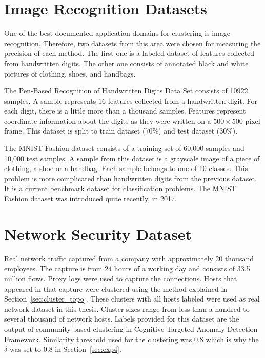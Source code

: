 \documentclass[thesis=B,english]{FITthesis}[2012/10/20]
\begin{document}
\section{Image Recognition Datasets}
One of the best-documented application domains for clustering is image recognition.
Therefore, two datasets from this area were chosen for measuring the precision of each method.
The first one is a labeled dataset of features collected from handwritten digits.
The other one consists of annotated black and white pictures of clothing, shoes, and handbags.

The Pen-Based Recognition of Handwritten Digits Data Set \cite{dua1998pendigit} consists of 10922 samples.
A sample represents 16 features collected from a handwritten digit.
For each digit, there is a little more than a thousand samples.
Features represent coordinate information about the digits as they were written on a $500\times500$ pixel frame.
This dataset is split to train dataset (70\%) and test dataset (30\%).

The MNIST Fashion dataset \cite{xiao2017fashion} consists of a training set of 60,000 samples and 10,000 test samples.
A sample from this dataset is a grayscale image of a piece of clothing, a shoe or a handbag.
Each sample belongs to one of 10 classes.
This problem is more complicated than handwritten digits from the previous dataset.
It is a current benchmark dataset for classification problems.
The MNIST Fashion dataset was introduced quite recently, in 2017.

\section{Network Security Dataset}\label{sec:real-data}
Real network traffic captured from a company with approximately 20 thousand employees.
The capture is from 24 hours of a working day and consists of 33.5  million flows.
Proxy logs were used to capture the connections.
Hosts that appeared in that capture were clustered using the method explained in Section~\ref{sec:cluster_topo}.
These clusters with all hosts labeled were used as real network dataset in this thesis.
Cluster sizes range from less than a hundred to several thousand of network hosts.
Labels provided for this dataset are the output of community-based clustering in Cognitive Targeted Anomaly Detection Framework.
Similarity threshold used for the clustering was 0.8 which is why the $\delta$ was set to 0.8 in Section~\ref{sec:exp4}.

\end{document}
